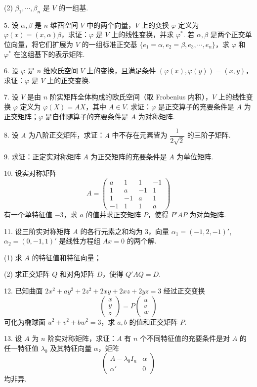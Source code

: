 \documentclass[UTF8, 12pt, fontset=fandol, oneside]{ctexart}
\begin{document}
(2) $\beta_1,\cdots,\beta_n$ 是 $V$ 的一组基.

5. 设 $\alpha,\beta$ 是 $n$ 维酉空间 $V$ 中的两个向量，$V$ 上的变换 $\varphi$ 定义为 $\varphi(x)=(x,\alpha)\beta$，求证：$\varphi$ 是 $V$ 上的线性变换，并求 $\varphi^*$. 若 $\alpha,\beta$ 是两个正交单位向量，将它们扩展为 $V$ 的一组标准正交基 $\{e_1=\alpha,e_2=\beta,e_3,\cdots,e_n\}$，求 $\varphi$ 和 $\varphi^*$ 在这组基下的表示矩阵.

6. 设 $\varphi$ 是 $n$ 维欧氏空间 $V$ 上的变换，且满足条件 $(\varphi(x),\varphi(y))=(x,y)$，求证：$\varphi$ 是 $V$ 上的正交变换.

7. 设 $V$ 是由 $n$ 阶实矩阵全体构成的欧氏空间（取 Frobenius 内积），$V$ 上的线性变换 $\varphi$ 定义为 $\varphi(X)=AX$，其中 $A\in V$. 求证：$\varphi$ 是正交算子的充要条件是 $A$ 为正交矩阵；$\varphi$ 是自伴随算子的充要条件是 $A$ 为对称矩阵.

8. 设 $A$ 为八阶正交矩阵，求证：$A$ 中不存在元素皆为 $\dfrac{1}{2\sqrt{2}}$ 的三阶子矩阵.

9. 求证：正定实对称矩阵 $A$ 为正交矩阵的充要条件是 $A$ 为单位矩阵.

10. 设实对称矩阵
\[
A=\begin{pmatrix}
a&1&1&-1\\
1&a&-1&1\\
1&-1&a&1\\
-1&1&1&a
\end{pmatrix}
\]
有一个单特征值 $-3$，求 $a$ 的值并求正交矩阵 $P$，使得 $P'AP$ 为对角矩阵.

11. 设三阶实对称矩阵 $A$ 的各行元素之和均为 $3$，向量 $\alpha_1=(-1,2,-1)'$, $\alpha_2=(0,-1,1)'$ 是线性方程组 $Ax=0$ 的两个解.

(1) 求 $A$ 的特征值和特征向量；

(2) 求正交矩阵 $Q$ 和对角矩阵 $D$，使得 $Q'AQ=D$.

12. 已知曲面 $2x^2+ay^2+2z^2+2xy+2xz+2yz=3$ 经过正交变换
\[
\begin{pmatrix}
x\\
y\\
z
\end{pmatrix}
=P
\begin{pmatrix}
u\\
v\\
w
\end{pmatrix}
\]
可化为椭球面 $u^2+v^2+bw^2=3$，求 $a,b$ 的值和正交矩阵 $P$.

13. 设 $A$ 为 $n$ 阶实对称矩阵，求证：$A$ 有 $n$ 个不同特征值的充要条件是对 $A$ 的任一特征值 $\lambda_0$ 及其特征向量 $\alpha$，矩阵
\[
\begin{pmatrix}
A-\lambda_0I_n&\alpha\\
\alpha'&0
\end{pmatrix}
\]
均非异.
\end{document}
